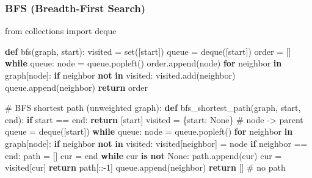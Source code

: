 \documentclass[11pt]{article}
\newenvironment{Shaded}{\begin{snugshade}}{\end{snugshade}}
\newcommand{\BuiltInTok}[1]{\textcolor[rgb]{0.50,0.55,0.55}{#1}}
\newcommand{\CommentTok}[1]{\textcolor[rgb]{0.48,0.49,0.49}{#1}}
\newcommand{\ControlFlowTok}[1]{\textcolor[rgb]{0.99,0.74,0.29}{\textbf{#1}}}
\newcommand{\DecValTok}[1]{\textcolor[rgb]{0.96,0.45,0.00}{#1}}
\newcommand{\ImportTok}[1]{\textcolor[rgb]{0.15,0.68,0.38}{#1}}
\newcommand{\KeywordTok}[1]{\textcolor[rgb]{0.81,0.81,0.76}{\textbf{#1}}}
\newcommand{\NormalTok}[1]{\textcolor[rgb]{0.81,0.81,0.76}{#1}}
\newcommand{\OperatorTok}[1]{\textcolor[rgb]{0.81,0.81,0.76}{#1}}
\newcommand{\VariableTok}[1]{\textcolor[rgb]{0.15,0.68,0.68}{#1}}
\begin{document}
\subsubsection{BFS (Breadth-First Search)}\label{bfs-breadth-first-search}


\begin{Shaded}
\begin{Highlighting}[]
\ImportTok{from}\NormalTok{ collections }\ImportTok{import}\NormalTok{ deque}

\KeywordTok{def}\NormalTok{ bfs(graph, start):}
\NormalTok{    visited }\OperatorTok{=} \BuiltInTok{set}\NormalTok{([start])}
\NormalTok{    queue }\OperatorTok{=}\NormalTok{ deque([start])}
\NormalTok{    order }\OperatorTok{=}\NormalTok{ []}
    \ControlFlowTok{while}\NormalTok{ queue:}
\NormalTok{        node }\OperatorTok{=}\NormalTok{ queue.popleft()}
\NormalTok{        order.append(node)}
        \ControlFlowTok{for}\NormalTok{ neighbor }\KeywordTok{in}\NormalTok{ graph[node]:}
            \ControlFlowTok{if}\NormalTok{ neighbor }\KeywordTok{not} \KeywordTok{in}\NormalTok{ visited:}
\NormalTok{                visited.add(neighbor)}
\NormalTok{                queue.append(neighbor)}
    \ControlFlowTok{return}\NormalTok{ order}

\CommentTok{\# BFS shortest path (unweighted graph):}
\KeywordTok{def}\NormalTok{ bfs\_shortest\_path(graph, start, end):}
    \ControlFlowTok{if}\NormalTok{ start }\OperatorTok{==}\NormalTok{ end: }\ControlFlowTok{return}\NormalTok{ [start]}
\NormalTok{    visited }\OperatorTok{=}\NormalTok{ \{start: }\VariableTok{None}\NormalTok{\}   }\CommentTok{\# node {-}\textgreater{} parent}
\NormalTok{    queue }\OperatorTok{=}\NormalTok{ deque([start])}
    \ControlFlowTok{while}\NormalTok{ queue:}
\NormalTok{        node }\OperatorTok{=}\NormalTok{ queue.popleft()}
        \ControlFlowTok{for}\NormalTok{ neighbor }\KeywordTok{in}\NormalTok{ graph[node]:}
            \ControlFlowTok{if}\NormalTok{ neighbor }\KeywordTok{not} \KeywordTok{in}\NormalTok{ visited:}
\NormalTok{                visited[neighbor] }\OperatorTok{=}\NormalTok{ node}
                \ControlFlowTok{if}\NormalTok{ neighbor }\OperatorTok{==}\NormalTok{ end:}
\NormalTok{                    path }\OperatorTok{=}\NormalTok{ []}
\NormalTok{                    cur }\OperatorTok{=}\NormalTok{ end}
                    \ControlFlowTok{while}\NormalTok{ cur }\KeywordTok{is} \KeywordTok{not} \VariableTok{None}\NormalTok{:}
\NormalTok{                        path.append(cur)}
\NormalTok{                        cur }\OperatorTok{=}\NormalTok{ visited[cur]}
                    \ControlFlowTok{return}\NormalTok{ path[::}\OperatorTok{{-}}\DecValTok{1}\NormalTok{]}
\NormalTok{                queue.append(neighbor)}
    \ControlFlowTok{return}\NormalTok{ []   }\CommentTok{\# no path}
\end{Highlighting}
\end{Shaded}
\end{document}
